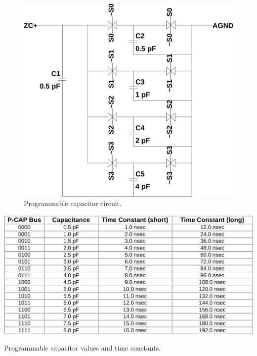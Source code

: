 \documentclass[12pt,oneside,final]{siuethesis}
\theoremstyle{definition}
\begin{document}
\begin{figure}[htbp!]
\centering
\includegraphics[scale=.4,keepaspectratio=true]{../LTspice_Drawings/nowlin/pcap.png} 
\caption{Programmable capacitor circuit.}
\label{fig:pcap}
\end{figure}
\begin{table}[htbp!]
 \centering
 \includegraphics[scale=.35,keepaspectratio=true]{../data/pcap.png}
 \caption{Programmable capacitor values and time constants.}
 \label{tab:pcap}
\end{table}
\end{document}
